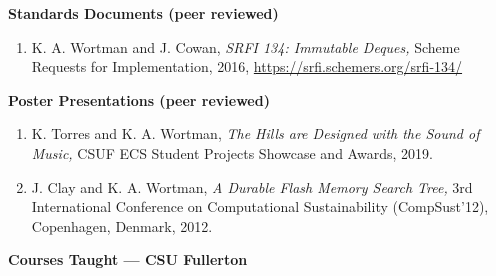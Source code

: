 \documentclass[11pt]{letter}
\begin{document}
\renewcommand{\labelenumi}{S-\arabic{enumi}.}
\textbf{Standards Documents (peer reviewed)}
\begin{enumerate}
\item \label{item:srfi134} K. A. Wortman and J. Cowan,
  \emph{SRFI 134: Immutable Deques,}
  Scheme Requests for Implementation, 2016,
  \url{https://srfi.schemers.org/srfi-134/}
\end{enumerate}

\renewcommand{\labelenumi}{P-\arabic{enumi}.}
\textbf{Poster Presentations (peer reviewed)}
\begin{enumerate}
  \item \label{item:hills} K. Torres and K. A. Wortman,
  \emph{The Hills are Designed with the Sound of Music,}
  CSUF ECS Student Projects Showcase and Awards, 2019.
\item \label{item:fmtree} J. Clay and K. A. Wortman, \emph{A Durable Flash Memory Search Tree,} 3rd International Conference on Computational Sustainability (CompSust'12), Copenhagen, Denmark, 2012.
\end{enumerate}

\renewcommand{\labelenumi}{\arabic{enumi}.}

\clearpage %

\textbf{Courses Taught --- CSU Fullerton}
\end{document}
